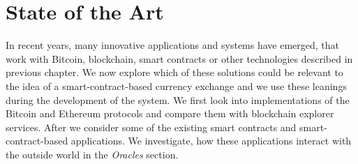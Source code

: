 \section{State of the Art}\label{sec:SOTA}
% 
In recent years, many innovative applications and systems have emerged, that work with Bitcoin, blockchain, smart contracts or other technologies described in previous chapter. We now explore which of these solutions could be relevant to the idea of a smart-contract-based currency exchange and we use these leanings during the development of the system. We first look into implementations of the Bitcoin and Ethereum protocols and compare them with blockchain explorer services. After we consider some of the existing smart contracts and smart-contract-based applications. We investigate, how these applications interact with the outside world in the \textit{Oracles} section. 


% 

% 

% 
% 
% 

